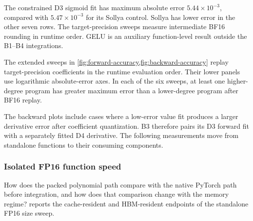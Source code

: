 \documentclass[11pt]{article}
\begin{document}
The constrained D3 sigmoid fit has maximum absolute error
$5.44\times10^{-3}$, compared with $5.47\times10^{-3}$ for its Sollya control.
Sollya has lower error in the other seven rows. The target-precision sweeps
measure intermediate BF16 rounding in runtime order. GELU is an auxiliary
function-level result outside the B1--B4 integrations.

The extended sweeps in
\cref{fig:forward-accuracy,fig:backward-accuracy} replay target-precision
coefficients in the runtime evaluation order. Their lower panels use
logarithmic absolute-error axes. In each of the six sweeps, at least one
higher-degree program has greater maximum error than a lower-degree program
after BF16 replay.

The backward plots include cases where a low-error value fit produces a larger
derivative error after coefficient quantization. B3 therefore pairs its D3
forward fit with a separately fitted D4 derivative. The following measurements
move from standalone functions to their consuming components.

\subsubsection{Isolated FP16 function speed}

How does the packed polynomial path compare with the native PyTorch path
before integration, and how does that comparison change with the memory
regime?  reports the cache-resident and HBM-resident
endpoints of the standalone FP16 size sweep.
\end{document}
